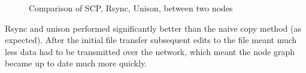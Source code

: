 \documentclass[12pt]{article}
\begin{document}

\begin{figure}[htp]
    \caption{Comparison of SCP, Rsync, Unison, between two nodes}
    \label{fig:point_comp_graph}
\end{figure}

Rsync and unison performed significantly better
than the naive copy method (as expected). After the initial file
transfer subsequent edits to the file meant much less data had to
be transmitted over the network, which meant the node graph
became up to date much more quickly.
\end{document}
